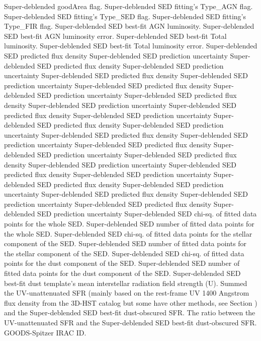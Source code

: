 Super-deblended goodArea flag.
Super-deblended SED fitting's Type_AGN flag.
Super-deblended SED fitting's Type_SED flag.
Super-deblended SED fitting's Type_FIR flag.
Super-deblended SED best-fit AGN luminosity.
Super-deblended SED best-fit AGN luminosity error.
Super-deblended SED best-fit Total luminosity.
Super-deblended SED best-fit Total luminosity error.
Super-deblended SED predicted flux density
Super-deblended SED prediction uncertainty
Super-deblended SED predicted flux density
Super-deblended SED prediction uncertainty
Super-deblended SED predicted flux density
Super-deblended SED prediction uncertainty
Super-deblended SED predicted flux density
Super-deblended SED prediction uncertainty
Super-deblended SED predicted flux density
Super-deblended SED prediction uncertainty
Super-deblended SED predicted flux density
Super-deblended SED prediction uncertainty
Super-deblended SED predicted flux density
Super-deblended SED prediction uncertainty
Super-deblended SED predicted flux density
Super-deblended SED prediction uncertainty
Super-deblended SED predicted flux density
Super-deblended SED prediction uncertainty
Super-deblended SED predicted flux density
Super-deblended SED prediction uncertainty
Super-deblended SED predicted flux density
Super-deblended SED prediction uncertainty
Super-deblended SED predicted flux density
Super-deblended SED prediction uncertainty
Super-deblended SED predicted flux density
Super-deblended SED prediction uncertainty
Super-deblended SED predicted flux density
Super-deblended SED prediction uncertainty
Super-deblended SED chi-sq. of fitted data points for the whole SED.
Super-deblended SED number of fitted data points for the whole SED.
Super-deblended SED chi-sq. of fitted data points for the stellar component of the SED.
Super-deblended SED number of fitted data points for the stellar component of the SED.
Super-deblended SED chi-sq. of fitted data points for the dust component of the SED.
Super-deblended SED number of fitted data points for the dust component of the SED.
Super-deblended SED best-fit dust template's mean interstellar radiation field strength (U).
Summed the UV-unattenuated SFR (mainly based on the rest-frame UV 1400 Angstrom flux density from the 3D-HST catalog but some have other methods, see Section ) and the Super-deblended SED best-fit dust-obscured SFR.
The ratio between the UV-unattenuated SFR and the Super-deblended SED best-fit dust-obscured SFR.
GOODS-Spitzer IRAC ID.